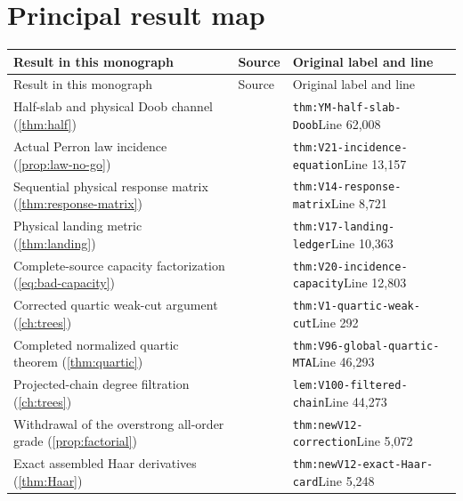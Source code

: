 \documentclass[11pt,oneside,openany]{book}
\theoremstyle{definition}
\theoremstyle{remark}
\begin{document}
\section{Principal result map}
\small
\begin{longtable}{L{0.32\textwidth}L{0.12\textwidth}L{0.477\textwidth}}
\toprule Result in this monograph & Source & Original label and line \\ \midrule
\endfirsthead
\toprule Result in this monograph & Source & Original label and line \\ \midrule
\endhead
Half-slab and physical Doob channel (\cref{thm:half}) & \cite{GT} & \nolinkurl{thm:YM-half-slab-Doob}\newline Line 62,008 \\
Actual Perron law incidence (\cref{prop:law-no-go}) & \cite{F1} & \nolinkurl{thm:V21-incidence-equation}\newline Line 13,157 \\
Sequential physical response matrix (\cref{thm:response-matrix}) & \cite{F1} & \nolinkurl{thm:V14-response-matrix}\newline Line 8,721 \\
Physical landing metric (\cref{thm:landing}) & \cite{F1} & \nolinkurl{thm:V17-landing-ledger}\newline Line 10,363 \\
Complete-source capacity factorization (\cref{eq:bad-capacity}) & \cite{F1} & \nolinkurl{thm:V20-incidence-capacity}\newline Line 12,803 \\
Corrected quartic weak-cut argument (\cref{ch:trees}) & \cite{F2} & \nolinkurl{thm:V1-quartic-weak-cut}\newline Line 292 \\
Completed normalized quartic theorem (\cref{thm:quartic}) & \cite{F3} & \nolinkurl{thm:V96-global-quartic-MTA}\newline Line 46,293 \\
Projected-chain degree filtration (\cref{ch:trees}) & \cite{F4} & \nolinkurl{lem:V100-filtered-chain}\newline Line 44,273 \\
Withdrawal of the overstrong all-order grade (\cref{prop:factorial}) & \cite{F5} & \nolinkurl{thm:newV12-correction}\newline Line 5,072 \\
Exact assembled Haar derivatives (\cref{thm:Haar}) & \cite{F5} & \nolinkurl{thm:newV12-exact-Haar-card}\newline Line 5,248 \\

\end{longtable}
\end{document}
